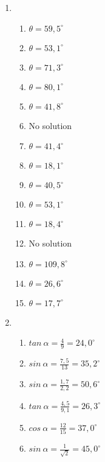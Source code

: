  \begin{solutions}{}{
\begin{enumerate}[itemsep=5pt, label=\textbf{\arabic*}. ] 


\item 
    \begin{enumerate}[noitemsep, label=\textbf{(\alph*)} ]
\item $\theta = 59,5^{\circ}$%
\item $\theta =53,1^{\circ}$%
\item $\theta =71,3^{\circ}$%
\item $\theta =80,1^{\circ}$%
\item $\theta =41,8^{\circ}$%
\item No solution%
\item $\theta =41,4^{\circ}$%
\item $\theta =18,1^{\circ}$%
\item $\theta =40,5^{\circ}$%
\item $\theta =53,1^{\circ}$%
\item $\theta =18,4^{\circ}$%
\item No solution%
\item $\theta =109,8^{\circ}$%
\item $\theta =26,6^{\circ}$%
\item $\theta =17,7^{\circ}$%
\end{enumerate}
\item 

    \begin{enumerate}[noitemsep, label=\textbf{(\alph*)} ]
\item $tan~ \alpha = \frac{4}{9}=24,0^{\circ}$
\item $sin~\alpha = \frac{7,5}{13}=35,2^{\circ}$
\item $sin~\alpha= \frac{1,7}{2,2}=50,6^{\circ}$
\item $tan~\alpha=\frac{4,5}{9,1}=26,3^{\circ}$
\item $cos~\alpha=\frac{12}{15}=37,0^{\circ}$
\item $sin~\alpha=\frac{1}{\sqrt{2}}=45,0^{\circ}$
      \end{enumerate}

\end{enumerate}}
\end{solutions}


